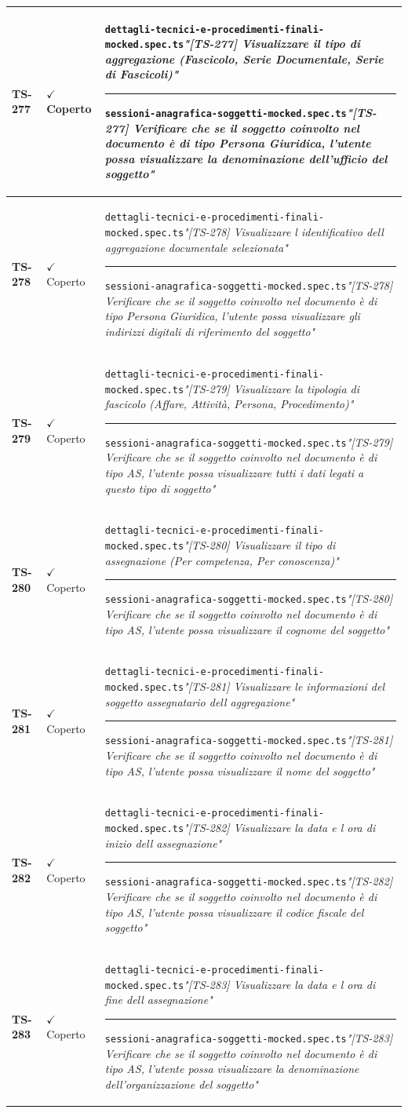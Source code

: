 \documentclass[a4paper,12pt]{article}
\newcommand{\ok}{\textcolor{green!60!black}{$\checkmark$ Coperto}}
\newcommand{\f}[1]{\nolinkurl{#1}\newline}
\newcommand{\q}[1]{\textit{#1}}
\newcommand{\sep}{\newline \vspace{2mm} \hrule \vspace{2mm}}
\begin{document}
\begin{longtable}{|p{1.5cm}|p{3.0cm}|p{10.5cm}|}
\textbf{TS-277} & \ok & \f{dettagli-tecnici-e-procedimenti-finali-mocked.spec.ts}\q{"[TS-277] Visualizzare il tipo di aggregazione (Fascicolo, Serie Documentale, Serie di Fascicoli)"} \sep \f{sessioni-anagrafica-soggetti-mocked.spec.ts}\q{"[TS-277] Verificare che se il soggetto coinvolto nel documento è di tipo Persona Giuridica, l'utente possa visualizzare la denominazione dell'ufficio del soggetto"} \\ \hline
\textbf{TS-278} & \ok & \f{dettagli-tecnici-e-procedimenti-finali-mocked.spec.ts}\q{"[TS-278] Visualizzare l identificativo dell aggregazione documentale selezionata"} \sep \f{sessioni-anagrafica-soggetti-mocked.spec.ts}\q{"[TS-278] Verificare che se il soggetto coinvolto nel documento è di tipo Persona Giuridica, l'utente possa visualizzare gli indirizzi digitali di riferimento del soggetto"} \\ \hline
\textbf{TS-279} & \ok & \f{dettagli-tecnici-e-procedimenti-finali-mocked.spec.ts}\q{"[TS-279] Visualizzare la tipologia di fascicolo (Affare, Attività, Persona, Procedimento)"} \sep \f{sessioni-anagrafica-soggetti-mocked.spec.ts}\q{"[TS-279] Verificare che se il soggetto coinvolto nel documento è di tipo AS, l'utente possa visualizzare tutti i dati legati a questo tipo di soggetto"} \\ \hline
\textbf{TS-280} & \ok & \f{dettagli-tecnici-e-procedimenti-finali-mocked.spec.ts}\q{"[TS-280] Visualizzare il tipo di assegnazione (Per competenza, Per conoscenza)"} \sep \f{sessioni-anagrafica-soggetti-mocked.spec.ts}\q{"[TS-280] Verificare che se il soggetto coinvolto nel documento è di tipo AS, l'utente possa visualizzare il cognome del soggetto"} \\ \hline
\textbf{TS-281} & \ok & \f{dettagli-tecnici-e-procedimenti-finali-mocked.spec.ts}\q{"[TS-281] Visualizzare le informazioni del soggetto assegnatario dell aggregazione"} \sep \f{sessioni-anagrafica-soggetti-mocked.spec.ts}\q{"[TS-281] Verificare che se il soggetto coinvolto nel documento è di tipo AS, l'utente possa visualizzare il nome del soggetto"} \\ \hline
\textbf{TS-282} & \ok & \f{dettagli-tecnici-e-procedimenti-finali-mocked.spec.ts}\q{"[TS-282] Visualizzare la data e l ora di inizio dell assegnazione"} \sep \f{sessioni-anagrafica-soggetti-mocked.spec.ts}\q{"[TS-282] Verificare che se il soggetto coinvolto nel documento è di tipo AS, l'utente possa visualizzare il codice fiscale del soggetto"} \\ \hline
\textbf{TS-283} & \ok & \f{dettagli-tecnici-e-procedimenti-finali-mocked.spec.ts}\q{"[TS-283] Visualizzare la data e l ora di fine dell assegnazione"} \sep \f{sessioni-anagrafica-soggetti-mocked.spec.ts}\q{"[TS-283] Verificare che se il soggetto coinvolto nel documento è di tipo AS, l'utente possa visualizzare la denominazione dell'organizzazione del soggetto"} \\ \hline

\end{longtable}
\end{document}
